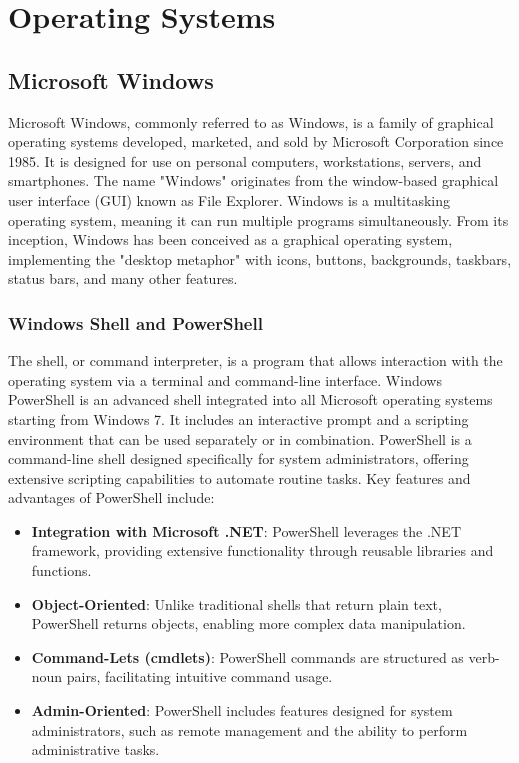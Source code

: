 \section{Operating Systems}

\subsection{Microsoft Windows}
Microsoft Windows, commonly referred to as Windows, is a family of graphical operating systems developed, marketed, and sold by Microsoft Corporation since 1985. It is designed for use on personal computers, workstations, servers, and smartphones. The name "Windows" originates from the window-based graphical user interface (GUI) known as File Explorer. Windows is a multitasking operating system, meaning it can run multiple programs simultaneously. From its inception, Windows has been conceived as a graphical operating system, implementing the "desktop metaphor" with icons, buttons, backgrounds, taskbars, status bars, and many other features.

\subsubsection{Windows Shell and PowerShell}
The shell, or command interpreter, is a program that allows interaction with the operating system via a terminal and command-line interface. Windows PowerShell is an advanced shell integrated into all Microsoft operating systems starting from Windows 7. It includes an interactive prompt and a scripting environment that can be used separately or in combination. PowerShell is a command-line shell designed specifically for system administrators, offering extensive scripting capabilities to automate routine tasks. Key features and advantages of PowerShell include:
\begin{itemize}
    \item \textbf{Integration with Microsoft .NET}: PowerShell leverages the .NET framework, providing extensive functionality through reusable libraries and functions.
    \item \textbf{Object-Oriented}: Unlike traditional shells that return plain text, PowerShell returns objects, enabling more complex data manipulation.
    \item \textbf{Command-Lets (cmdlets)}: PowerShell commands are structured as verb-noun pairs, facilitating intuitive command usage.
    \item \textbf{Admin-Oriented}: PowerShell includes features designed for system administrators, such as remote management and the ability to perform administrative tasks.
\end{itemize}

